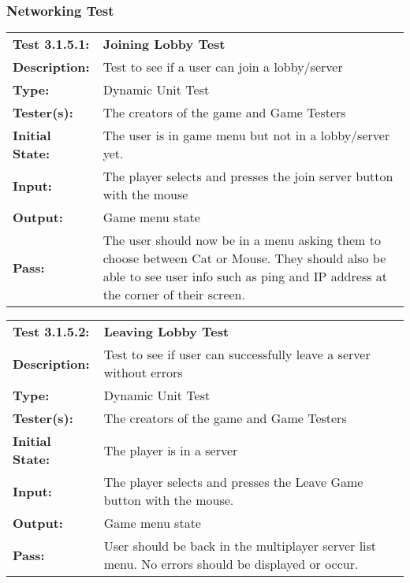 \documentclass[12pt, titlepage]{article}
\begin{document}
\subsubsection{Networking Test}
\begin{mdframed}[linewidth=1pt]
\begin{tabularx}{\textwidth}{@{}p{3cm}X@{}}
{\bf Test 3.1.5.1:} & {\bf Joining Lobby Test}\\[\baselineskip]
{\bf Description:} & Test to see if a user can join a lobby/server\\[0.5\baselineskip]
{\bf Type:} & Dynamic Unit Test\\[0.5\baselineskip]
{\bf Tester(s):} & The creators of the game and Game Testers\\[0.5\baselineskip]
{\bf Initial State:} & The user is in game menu but not in a lobby/server yet. \\[0.5\baselineskip]
{\bf Input:} & The player selects and presses the join server button with the mouse \\[0.5\baselineskip]
{\bf Output:} & Game menu state\\[0.5\baselineskip]
{\bf Pass:} & The user should now be in a menu asking them to choose between Cat or Mouse. They should also be able to see user info such as ping and IP address at the corner of their screen.
\end{tabularx}
\end{mdframed}

\begin{mdframed}[linewidth=1pt]
\begin{tabularx}{\textwidth}{@{}p{3cm}X@{}}
{\bf Test 3.1.5.2:} & {\bf Leaving Lobby Test}\\[\baselineskip]
{\bf Description:} & Test to see if user can successfully leave a server without errors\\[0.5\baselineskip]
{\bf Type:} & Dynamic Unit Test\\[0.5\baselineskip]
{\bf Tester(s):} & The creators of the game and Game Testers\\[0.5\baselineskip]
{\bf Initial State:} & The player is in a server\\[0.5\baselineskip]
{\bf Input:} & The player selects and presses the Leave Game button with the mouse. \\[0.5\baselineskip]
{\bf Output:} & Game menu state\\[0.5\baselineskip]
{\bf Pass:} & User should be back in the multiplayer server list menu. No errors should be displayed or occur.
\end{tabularx}
\end{mdframed}
\end{document}
